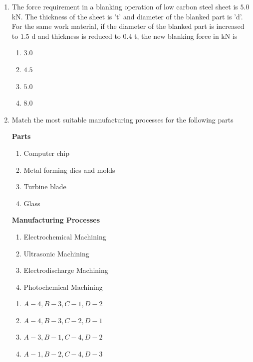 \documentclass[journal]{IEEEtran}
\begin{document}
\begin{enumerate}[start = 52]
    \item The force requirement in a blanking operation of low carbon steel sheet is $5.0$ kN. The thickness of the sheet is 't' and diameter of the blanked part is 'd'. For the same work material, if the diameter of the blanked part is increased to $1.5$ d and thickness is reduced to $0.4$ t, the new blanking force in kN is
    \begin{multicols}{4}
        \begin{enumerate}
            \item $3.0$
            \item $4.5$
            \item $5.0$
            \item $8.0$
        \end{enumerate}
    \end{multicols}

    \item Match the most suitable manufacturing processes for the following parts
        \begin{multicols}{2}
			\textbf{Parts}
			\begin{enumerate}[label=(\Alph*)]
                
				\item Computer chip
				\item Metal forming dies and molds
                    \item Turbine blade
                    \item Glass
			\end{enumerate}
			\columnbreak
			\textbf{Manufacturing Processes}
			\begin{enumerate}[label=(\arabic*)]
				\item Electrochemical Machining
				\item Ultrasonic Machining
				\item Electrodischarge Machining
                    \item Photochemical Machining
			\end{enumerate}
		\end{multicols}

      \begin{multicols}{2}
        \begin{enumerate}
            \item $A-4,B-3,C-1,D-2$
            \item $A-4,B-3,C-2,D-1$
            \item $A-3,B-1,C-4,D-2$
            \item $A-1,B-2,C-4,D-3$
        \end{enumerate}
    \end{multicols}


\end{enumerate}
\end{document}
